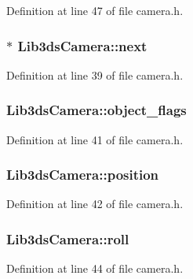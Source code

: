 Definition at line 47 of file camera.\-h.

\hypertarget{struct_lib3ds_camera_a7a97ca5f129c077a526f0eaee34c6d8e}{
\subsubsection[{next}]{$\ast$ Lib3ds\-Camera\-::next}}\label{struct_lib3ds_camera_a7a97ca5f129c077a526f0eaee34c6d8e}


Definition at line 39 of file camera.\-h.

\hypertarget{struct_lib3ds_camera_a6c25abb4ea0c132b826cb66bacc8e756}{
\subsubsection[{object\-\_\-flags}]{ Lib3ds\-Camera\-::object\-\_\-flags}}\label{struct_lib3ds_camera_a6c25abb4ea0c132b826cb66bacc8e756}


Definition at line 41 of file camera.\-h.

\hypertarget{struct_lib3ds_camera_aff0af1c668e44ec404f87377d7ec81ee}{
\subsubsection[{position}]{ Lib3ds\-Camera\-::position}}\label{struct_lib3ds_camera_aff0af1c668e44ec404f87377d7ec81ee}


Definition at line 42 of file camera.\-h.

\hypertarget{struct_lib3ds_camera_af3e8475e88c05aa83830537640a10653}{
\subsubsection[{roll}]{ Lib3ds\-Camera\-::roll}}\label{struct_lib3ds_camera_af3e8475e88c05aa83830537640a10653}


Definition at line 44 of file camera.\-h.

